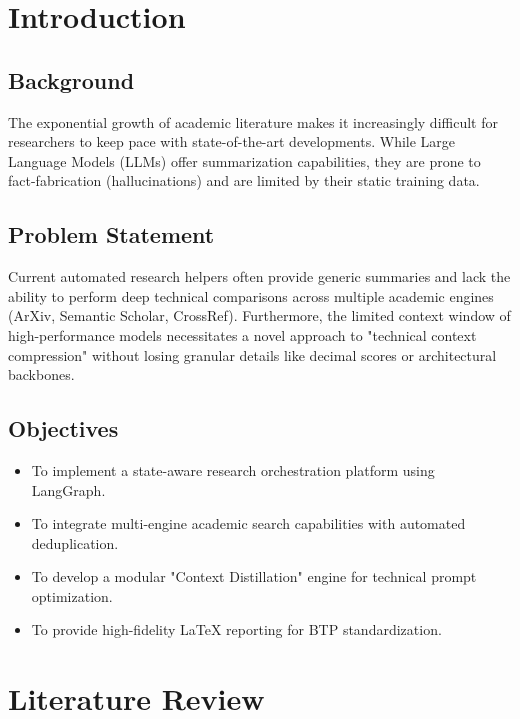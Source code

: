 \documentclass[11pt,a4paper,oneside]{report}
\begin{document}
\clearpage
{}

\chapter{Introduction}
\label{ch:intro}

\section{Background}
The exponential growth of academic literature makes it increasingly difficult for researchers to keep pace with state-of-the-art developments. While Large Language Models (LLMs) offer summarization capabilities, they are prone to fact-fabrication (hallucinations) and are limited by their static training data.

\section{Problem Statement}
Current automated research helpers often provide generic summaries and lack the ability to perform deep technical comparisons across multiple academic engines (ArXiv, Semantic Scholar, CrossRef). Furthermore, the limited context window of high-performance models necessitates a novel approach to "technical context compression" without losing granular details like decimal scores or architectural backbones.

\section{Objectives}
\begin{itemize}
    \item To implement a state-aware research orchestration platform using LangGraph.
    \item To integrate multi-engine academic search capabilities with automated deduplication.
    \item To develop a modular "Context Distillation" engine for technical prompt optimization.
    \item To provide high-fidelity LaTeX reporting for BTP standardization.
\end{itemize}

\chapter{Literature Review}
\label{ch:lit_review}
\end{document}
